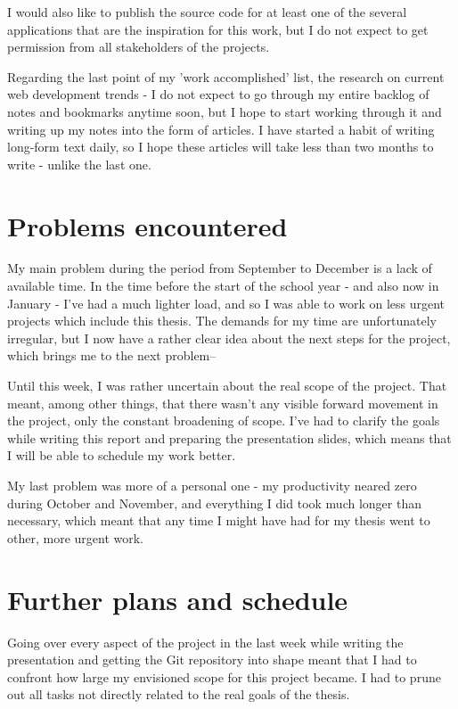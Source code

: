 \documentclass[11pt,a4paper]{scrartcl}
\begin{document}
I would also like to publish the source code for at least one of the several
applications that are the inspiration for this work, but I do not expect to get
permission from all stakeholders of the projects.

Regarding the last point of my 'work accomplished' list, the research on current
web development trends - I do not expect to go through my entire backlog of
notes and bookmarks anytime soon, but I hope to start working through it and
writing up my notes into the form of articles. I have started a habit of writing
long-form text daily, so I hope these articles will take less than two months to
write - unlike the last one.

\section{Problems encountered}
\label{sec:org4fffc61}
My main problem during the period from September to December is a lack of
available time. In the time before the start of the school year - and also now
in January - I've had a much lighter load, and so I was able to work on less
urgent projects which include this thesis. The demands for my time are
unfortunately irregular, but I now have a rather clear idea about the next steps
for the project, which brings me to the next problem--

Until this week, I was rather uncertain about the real scope of the
project. That meant, among other things, that there wasn't any visible forward
movement in the project, only the constant broadening of scope. I've had to
clarify the goals while writing this report and preparing the presentation
slides, which means that I will be able to schedule my work better.

My last problem was more of a personal one - my productivity neared zero during
October and November, and everything I did took much longer than necessary,
which meant that any time I might have had for my thesis went to other, more
urgent work.

\section{Further plans and schedule}
\label{sec:org5e9a410}
Going over every aspect of the project in the last week while writing the
presentation and getting the Git repository into shape meant that I had to
confront how large my envisioned scope for this project became. I had to prune
out all tasks not directly related to the real goals of the thesis.
\end{document}
